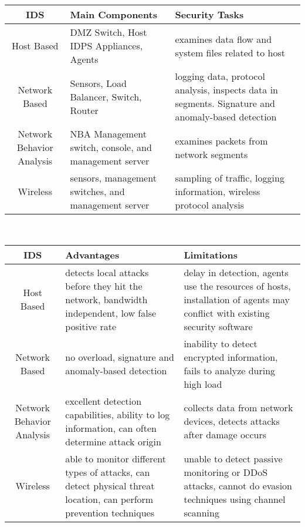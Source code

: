 \documentclass{math}
\begin{document}
\begin{center}
  \begin{tabular}{|c|p{4.5cm}|p{4.5cm}|}
    \hline
    IDS & Main Components & Security Tasks \\
    \hline
    Host Based & DMZ Switch, Host IDPS Appliances, Agents & examines data flow
      and system files related to host \\
    \hline
    Network Based & Sensors, Load Balancer, Switch, Router & logging data,
      protocol analysis, inspects data in segments. Signature and anomaly-based
      detection \\
    \hline
    Network Behavior Analysis & NBA Management switch, console, and management
      server & examines packets from network segments \\
    \hline
    Wireless & sensors, management switches, and management server & sampling of
      traffic, logging information, wireless protocol analysis \\
    \hline
  \end{tabular} \\[2cm]
  \begin{tabular}{|c|p{4.5cm}|p{4.5cm}|}
    \hline
    IDS & Advantages & Limitations \\
    \hline
    Host Based & detects local attacks before they hit the network, bandwidth
      independent, low false positive rate & delay in detection, agents use the
      resources of hosts, installation of agents may conflict with existing
      security software \\
    \hline
    Network Based & no overload, signature and anomaly-based detection &
      inability to detect encrypted information, fails to analyze during high
      load \\
    \hline
    Network Behavior Analysis & excellent detection capabilities, ability to log
      information, can often determine attack origin & collects data from
      network devices, detects attacks after damage occurs \\
    \hline
    Wireless & able to monitor different types of attacks, can detect physical
      threat location, can perform prevention techniques & unable to detect
      passive monitoring or DDoS attacks, cannot do evasion techniques using
      channel scanning \\
    \hline
  \end{tabular}
\end{center}
\end{document}
